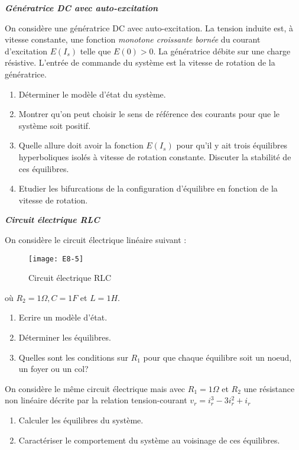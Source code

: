 \begin{exercice}{\bf \em Génératrice DC avec auto-excitation}

On considère une génératrice DC avec auto-excitation. La tension induite est, à vitesse constante, une fonction {\em monotone
croissante bornée} du courant d'excitation $E(I_s)$ telle que $E(0) >
0$. La génératrice débite sur une charge résistive. L'entrée de
commande du système est la vitesse de rotation de la
génératrice.
\begin{enumerate}
\item Déterminer le modèle d'état du système.
\item Montrer qu'on peut choisir le sens de référence des courants pour que le système soit positif.
\item Quelle allure doit avoir la fonction $E(I_s)$ pour qu'il y ait trois
équilibres hyperboliques isolés à vitesse de rotation constante. Discuter la
stabilité de ces équilibres.
\item Etudier les bifurcations de la configuration d'équilibre en fonction de la vitesse de rotation.
\end{enumerate}
\end{exercice}
\vv

\begin{exercice} {\bf \em Circuit électrique RLC} 

On considère le circuit électrique linéaire suivant :
\begin{figure}[h] 
   \centering
   \texttt{[image: E8-5]} 
   \caption{Circuit électrique RLC}
   \label{fig:E8-5}
\end{figure}

où $R_2 = 1\Omega, C = 1F$ et $L = 1H$.

\begin{enumerate}
\item Ecrire un modèle d'état.
\item Déterminer les équilibres.
\item Quelles sont les conditions sur $R_1$ pour que chaque équilibre soit un
noeud, un foyer ou un col?
\end{enumerate}

On considère le même circuit électrique mais avec $R_1 = 1\Omega$ et $R_2$ une résistance non
linéaire décrite par la relation tension-courant $v_r = i^3_r - 3i^2_r + i_r$
\begin{enumerate}
\item Calculer les équilibres du système.
\item Caractériser le comportement du système au voisinage de ces équilibres.
\end{enumerate}
\end{exercice}
\vv 

